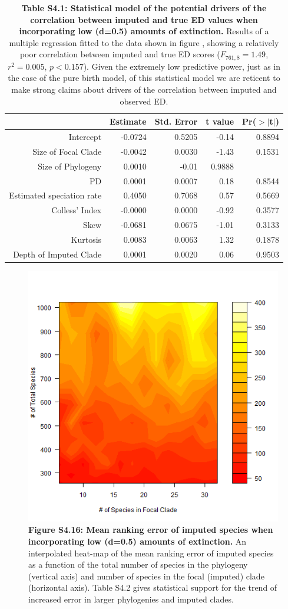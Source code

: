 \documentclass[10pt,english]{article}
\begin{document}
\begin{table}[ht]
  \centering
  \begin{tabular}{rrrrr}
    \hline
   & Estimate & Std. Error & t value & Pr($>$$|$t$|$) \\
    \hline
    Intercept & -0.0724 & 0.5205 & -0.14 & 0.8894 \\
    Size of Focal Clade & -0.0042 & 0.0030 & -1.43 & 0.1531 \\
    Size of Phylogeny & 0.0010 & -0.01 & 0.9888 \\
    PD & 0.0001 & 0.0007 & 0.18 & 0.8544 \\
    Estimated speciation rate & 0.4050 & 0.7068 & 0.57 & 0.5669 \\
    Colless' Index & -0.0000 & 0.0000 & -0.92 & 0.3577 \\
    Skew & -0.0681 & 0.0675 & -1.01 & 0.3133 \\
    Kurtosis & 0.0083 & 0.0063 & 1.32 & 0.1878 \\
    Depth of Imputed Clade & 0.0001 & 0.0020 & 0.06 & 0.9503 \\
     \hline
\end{tabular}
\caption{\textbf{Table S4.1: Statistical model of the potential drivers of the
    correlation between imputed and true ED values when incorporating low
    (d=0.5) amounts of extinction.} Results of a multiple regression fitted to
    the data shown in figure , showing a relatively poor correlation between
    imputed and true ED scores ($F_{761,8} = 1.49$, $r^{2} = 0.005$, $p <
    0.157$). Given the extremely low predictive power, just as in the case of
    the pure birth model, of this statistical model we are reticent to make
    strong claims about drivers of the correlation between imputed and observed
    ED.}
\end{table}

\begin{figure}[!ht]
  \center
  \includegraphics[width=.5\textwidth]{../figures/rankingErrorLowExtinction.png}
  \caption{\textbf{Figure S4.16: Mean ranking error of imputed species when
  incorporating low (d=0.5) amounts of extinction.} An interpolated heat-map of
  the mean ranking error of imputed species as a function of the total number of
  species in the phylogeny (vertical axis) and number of species in the focal
  (imputed) clade (horizontal axis). Table S4.2 gives statistical support for
  the trend of increased error in larger phylogenies and imputed clades.}
\end{figure}
\end{document}
